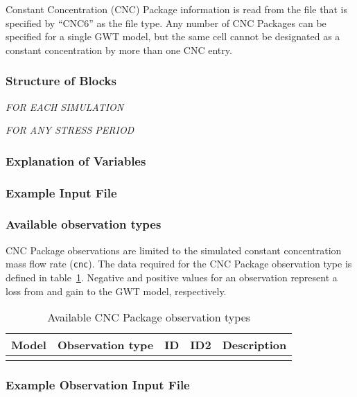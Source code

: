 Constant Concentration (CNC) Package information is read from the file that is specified by ``CNC6'' as the file type.  Any number of CNC Packages can be specified for a single GWT model, but the same cell cannot be designated as a constant concentration by more than one CNC entry. 

\vspace{5mm}
\subsubsection{Structure of Blocks}
\vspace{5mm}

\noindent \textit{FOR EACH SIMULATION}


\vspace{5mm}
\noindent \textit{FOR ANY STRESS PERIOD}

\packageperioddescription

\vspace{5mm}
\subsubsection{Explanation of Variables}
\begin{description}

\end{description}

\vspace{5mm}
\subsubsection{Example Input File}


\vspace{5mm}
\subsubsection{Available observation types}
CNC Package observations are limited to the simulated constant concentration mass flow rate (\texttt{cnc}). The data required for the CNC Package observation type is defined in table~\ref{table:gwt-cncobstype}. Negative and positive values for an observation represent a loss from and gain to the GWT model, respectively.

\begin{longtable}{p{2cm} p{2.75cm} p{2cm} p{1.25cm} p{7cm}}
\caption{Available CNC Package observation types} \tabularnewline

\hline
\hline
\textbf{Model} & \textbf{Observation type} & \textbf{ID} & \textbf{ID2} & \textbf{Description} \\
\hline
\endhead

\hline
\endfoot


\label{table:gwt-cncobstype}
\end{longtable}

\vspace{5mm}
\subsubsection{Example Observation Input File}

